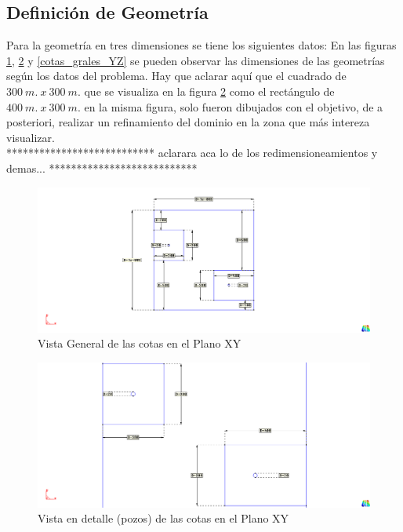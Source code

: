 \documentclass[10pt,a4paper,final]{article}
\begin{document}
\subsection{Definición de Geometría}
Para la geometría en tres dimensiones se tiene los siguientes datos:
En las figuras \ref{cotas_superiores_generalesXY}, \ref{cotas_superiores_detallesXY} y \ref{cotas_grales_YZ} se pueden observar
las dimensiones de las geometrías según los datos del problema. Hay que aclarar aquí que el cuadrado de $300~m.~x~300~m.$ que se visualiza
en la figura \ref{cotas_superiores_detallesXY} como el rectángulo de $400~m.~x~300~m.$ en la misma figura, solo fueron dibujados con el
objetivo, de a posteriori, realizar un refinamiento del dominio en la zona que más intereza visualizar.\\
***************************
aclarara aca lo de los redimensioneamientos y demas...
***************************
\begin{figure}[tbhp]
\centerline{\includegraphics[scale=0.75]{img/cotas_superiores_generalesXY}}
\caption{Vista General de las cotas en el Plano XY}
\label{cotas_superiores_generalesXY}
\end{figure}

%
\begin{figure}[tbhp]
\centerline{\includegraphics[scale=0.75]{img/cotas_superiores_detallesXY}}
\caption{Vista en detalle (pozos) de las cotas en el Plano XY}
\label{cotas_superiores_detallesXY}
\end{figure}
%
\end{document}
